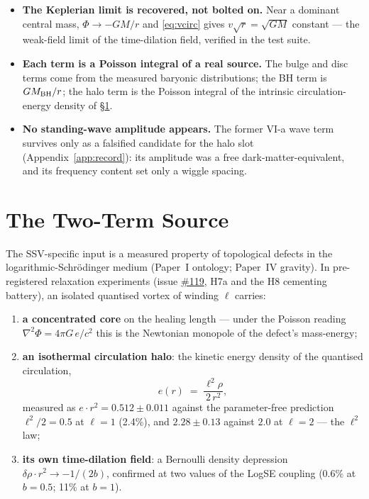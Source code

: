 \documentclass[11pt,a4paper]{article}
\providecommand{\ssvissue}[1]{\hyperref[issue:#1]{\##1}}
\begin{document}
\begin{itemize}
  \item \textbf{The Keplerian limit is recovered, not bolted on.}  Near a
    dominant central mass, $\Phi \to -GM/r$ and
    \eqref{eq:vcirc} gives $v\sqrt{r} = \sqrt{GM}$ constant --- the
    weak-field limit of the time-dilation field, verified in the test
    suite.
  \item \textbf{Each term is a Poisson integral of a real source.}  The
    bulge and disc terms come from the measured baryonic distributions;
    the BH term is $GM_{\rm BH}/r$; the halo term is the Poisson
    integral of the intrinsic circulation-energy density of
    \S\ref{sec:source}.
  \item \textbf{No standing-wave amplitude appears.}  The former VI-a
    wave term survives only as a falsified candidate for the halo slot
    (Appendix~\ref{app:record}): its amplitude was a free
    dark-matter-equivalent, and its frequency content set only a wiggle
    spacing.
\end{itemize}

\section{The Two-Term Source}
\label{sec:source}

The SSV-specific input is a measured property of topological defects in
the logarithmic-Schr\"odinger medium (Paper~I ontology; Paper~IV
gravity).  In pre-registered relaxation experiments
(issue \ssvissue{119}, H7a and the H8 cementing battery), an isolated
quantised vortex of winding $\ell$ carries:

\begin{enumerate}
  \item \textbf{a concentrated core} on the healing length --- under the
    Poisson reading $\nabla^2\Phi = 4\pi G\,e/c^2$ this is the Newtonian
    monopole of the defect's mass-energy;
  \item \textbf{an isothermal circulation halo}: the kinetic energy
    density of the quantised circulation,
    \begin{equation}
      e(r) \;=\; \frac{\ell^2 \rho}{2\,r^2},
      \label{eq:halo_energy}
    \end{equation}
    measured as $e\cdot r^2 = 0.512 \pm 0.011$ against the parameter-free
    prediction $\ell^2/2 = 0.5$ at $\ell = 1$ (2.4\%), and
    $2.28 \pm 0.13$ against $2.0$ at $\ell = 2$ --- the $\ell^2$ law;
  \item \textbf{its own time-dilation field}: a Bernoulli density
    depression $\delta\rho\cdot r^2 \to -1/(2b)$, confirmed at two values
    of the LogSE coupling (0.6\% at $b = 0.5$; 11\% at $b = 1$).
\end{enumerate}
\end{document}
